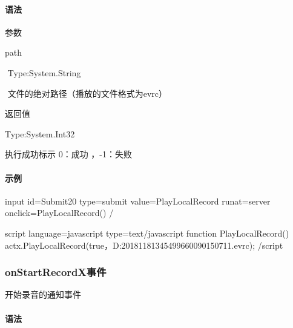 \documentclass[letterpaper,10pt,english]{sphinxmanual}
\begin{document}
\paragraph{语法}
\label{\detokenize{csharp_activex:id156}}
%
\begin{sphinxVerbatim}[commandchars=\\\{\}]
   
\end{sphinxVerbatim}

参数

path

​ Type:System.String

​ 文件的绝对路径（播放的文件格式为evrc）

返回值

Type:System.Int32

执行成功标示 0：成功 ，-1：失败


\paragraph{示例}
\label{\detokenize{csharp_activex:id157}}
%
\begin{sphinxVerbatim}[commandchars=\\\{\}]
\PYGZlt{}input id=\PYGZdq{}Submit20\PYGZdq{} type=\PYGZdq{}submit\PYGZdq{} value=\PYGZsq{}PlayLocalRecord\PYGZsq{} runat=\PYGZdq{}server\PYGZdq{}  onclick=\PYGZdq{}PlayLocalRecord()\PYGZdq{} /\PYGZgt{}

\PYGZlt{}script language=\PYGZdq{}javascript\PYGZdq{} type=\PYGZdq{}text/javascript\PYGZdq{}\PYGZgt{}
   function PlayLocalRecord() \PYGZob{}
        actx.PlayLocalRecord(true，\PYGZdq{}D:\PYGZbs{}2018\PYGZus{}1\PYGZus{}18\PYGZus{}13\PYGZus{}45\PYGZus{}4\PYGZus{}996\PYGZus{}600901\PYGZus{}50711.evrc\PYGZdq{});
    \PYGZcb{}
\PYGZlt{}/script\PYGZgt{}
\end{sphinxVerbatim}


\subsubsection{onStartRecordX事件}
\label{\detokenize{csharp_activex:onstartrecordx}}
开始录音的通知事件


\paragraph{语法}
\label{\detokenize{csharp_activex:id158}}
%
\begin{sphinxVerbatim}[commandchars=\\\{\}]
        
\end{sphinxVerbatim}
\end{document}
